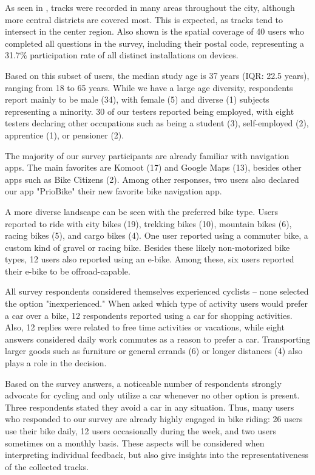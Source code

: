 As seen in , tracks were recorded in many areas throughout the city, although more central districts are covered most. This is expected, as tracks tend to intersect in the center region. Also shown is the spatial coverage of 40 users who completed all questions in the survey, including their postal code, representing a 31.7\% participation rate of all distinct installations on devices.

Based on this subset of users, the median study age is 37 years (IQR: 22.5 years), ranging from 18 to 65 years. While we have a large age diversity, respondents report mainly to be male (34), with female (5) and diverse (1) subjects representing a minority. 30 of our testers reported being employed, with eight testers declaring other occupations such as being a student (3), self-employed (2), apprentice (1), or pensioner (2).

The majority of our survey participants are already familiar with navigation apps. The main favorites are Komoot (17) and Google Maps (13), besides other apps such as Bike Citizens (2). Among other responses, two users also declared our app "PrioBike" their new favorite bike navigation app. 

A more diverse landscape can be seen with the preferred bike type. Users reported to ride with city bikes (19), trekking bikes (10), mountain bikes (6), racing bikes (5), and cargo bikes (4). One user reported using a commuter bike, a custom kind of gravel or racing bike. Besides these likely non-motorized bike types, 12 users also reported using an e-bike. Among these, six users reported their e-bike to be offroad-capable. 

All survey respondents considered themselves experienced cyclists -- none selected the option "inexperienced." When asked which type of activity users would prefer a car over a bike, 12 respondents reported using a car for shopping activities. Also, 12 replies were related to free time activities or vacations, while eight answers considered daily work commutes as a reason to prefer a car. Transporting larger goods such as furniture or general errands (6) or longer distances (4) also plays a role in the decision. 

Based on the survey answers, a noticeable number of respondents strongly advocate for cycling and only utilize a car whenever no other option is present. Three respondents stated they avoid a car in any situation. Thus, many users who responded to our survey are already highly engaged in bike riding: 26 users use their bike daily, 12 users occasionally during the week, and two users sometimes on a monthly basis. These aspects will be considered when interpreting individual feedback, but also give insights into the representativeness of the collected tracks.

